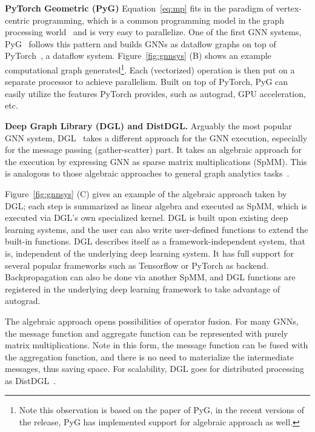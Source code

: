 \vspace{2mm}
\noindent \textbf{PyTorch Geometric (PyG)}  
Equation~\ref{eq:mp} fits in the paradigm of vertex-centric programming, which is a common programming model in the graph processing world~\cite{vertexcentric, powergraph, pregel} and is very easy to parallelize. One of the first GNN systems, PyG~\cite{pyg} follows this pattern and builds GNNs as dataflow graphs on top of PyTorch~\cite{torch}, a dataflow system. Figure~\ref{fig:gnnsys} (B) shows an example computational graph generated\footnote{Note this observation is based on the paper of PyG, in the recent versions of the release, PyG has implemented support for algebraic approach as well.}. Each (vectorized) operation is then put on a separate processor to achieve parallelism. Built on top of PyTorch, PyG can easily utilize the features PyTorch provides, such as autograd, GPU acceleration, etc. 

\vspace{2mm}
\noindent \textbf{Deep Graph Library (DGL) and DistDGL.}  
Arguably the most popular GNN system, DGL~\cite{dgl} takes a different approach for the GNN execution, especially for the message passing (gather-scatter) part. It takes an algebraic approach for the execution by expressing GNN as sparse matrix multiplications (SpMM). This is analogous to those algebraic approaches to general graph analytics tasks~\cite{graphla}.

Figure~\ref{fig:gnnsys} (C) gives an example of the algebraic approach taken by DGL; each step is summarized as linear algebra and executed as SpMM, which is executed via DGL's own specialized kernel. DGL is built upon existing deep learning systems, and the user can also write user-defined functions to extend the built-in functions. DGL describes itself as a framework-independent system, that is, independent of the underlying deep learning system. It has full support for several popular frameworks such as Tensorflow or PyTorch as backend. Backpropagation can also be done via another SpMM, and DGL functions are registered in the underlying deep learning framework to take advantage of autograd.

The algebraic approach opens possibilities of operator fusion. For many GNNs, the message function and aggregate function can be represented with purely matrix multiplications. Note in this form, the message function can be fused with the aggregation function, and there is no need to materialize the intermediate messages, thus saving space. For scalability, DGL goes for distributed processing as DistDGL~\cite{distdgl}.

